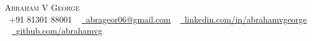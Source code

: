 \begin{center}
    {\Huge \scshape Abraham V George} \\ \vspace{1pt}
    \vspace{10pt}
    \small \raisebox{-0.1\height}\faPhone\ +91 81301 88001 ~ \href{abrageor06@gmail.com}
          {\raisebox{-0.2\height}\faEnvelope\  \underline{abrageor06@gmail.com}} ~ \href{https://linkedin.com/in/abrahamvgeorge/}
          {\raisebox{-0.2\height}\faLinkedin\ \underline{linkedin.com/in/abrahamvgeorge}}  ~
    \href{https://github.com/abrahamvg}{\raisebox{-0.2\height}\faGithub\ \underline{github.com/abrahamvg}}
    \vspace{-4pt}
\end{center}